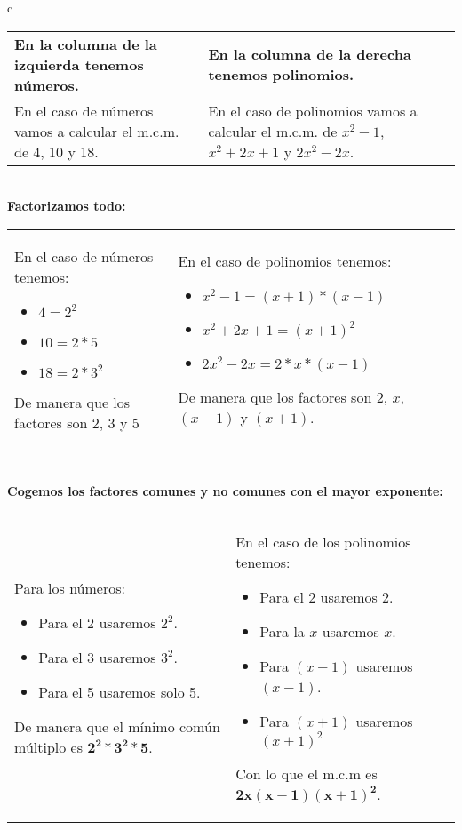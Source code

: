 \documentclass[a4paper,11pt,answers]{exam}
\begin{document}
\begin{tabular}{c}
  \begin{tabular}{p{8cm}|p{8cm}}
    \textbf{En la columna de la izquierda tenemos números.}
    &\textbf{En la columna de la derecha tenemos polinomios.}\\
                                                      
    En el caso de números vamos a calcular el m.c.m. de 4, 10 y 18.
    & En el caso de polinomios vamos a calcular el m.c.m. de $x^2 -1$, $x^2 + 2x + 1$ y $2x^2-2x$.\\
  \end{tabular}\\
  \hline
  \Large{\textbf{Factorizamos todo:}}\\
  \begin{tabular}{p{8cm}|p{8cm}}
    En el caso de números tenemos:
    \begin{itemize}
      \item $4=2^2$
      \item $10 = 2*5$
      \item $18 = 2*3^2$
      \end{itemize}
    De manera que los factores son $2$, $3$ y $5$
    &En el caso de polinomios tenemos:\begin{itemize}
    \item $x^2 - 1= (x+1)*(x-1)$
    \item $x^2 + 2x + 1 = (x+1)^2$
    \item $2x^2 - 2x = 2*x*(x-1)$
      \end{itemize}
      De manera que los factores son $2$, $x$, $(x-1)$ y $(x+1)$.
  \end{tabular}\\
  \hline
  \Large{\textbf{Cogemos los factores comunes y no comunes con el mayor exponente:}}\\
  \begin{tabular}{p{8cm}|p{8cm}}
    Para los números:
    \begin{itemize}
      \item Para el 2 usaremos $2^2$.
      \item Para el 3 usaremos $3^2$.
      \item Para el 5 usaremos solo 5.
      \end{itemize}
    De manera que el mínimo común múltiplo es $\boldsymbol{2^2*3^2*5}$.
    &En el caso de los polinomios tenemos:\begin{itemize}
    \item Para el 2 usaremos 2.
    \item Para la $x$ usaremos $x$.
    \item Para $(x-1)$ usaremos $(x-1)$.
    \item Para $(x+1)$ usaremos $(x+1)^2$
    \end{itemize}
      Con lo que el m.c.m es
     $\boldsymbol{2x(x-1)(x+1)^2}$.
  \end{tabular}
\end{tabular}\vspace{5mm}\\
\end{document}
